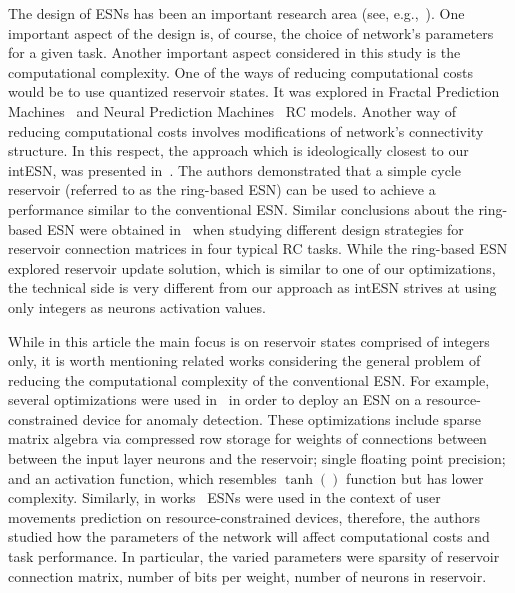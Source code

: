 The design of ESNs has been an important research area (see, e.g.,~\cite{Ozturk2007, Busing2010, Strauss2012}). 
One important aspect of the design is, of course, the choice of network's parameters for a given task.
Another important aspect considered in this study is the computational complexity. 
One of the ways of reducing computational costs would be to use quantized reservoir states. 
It was explored in Fractal Prediction Machines~\cite{Tino00} and Neural Prediction Machines~\cite{Tino04, Tino07} RC models. 
Another way of reducing computational costs involves modifications of network's connectivity structure. 
In this respect, the approach which is ideologically closest to our intESN, was presented in~\cite{MinESN}. 
The authors demonstrated that a simple cycle reservoir (referred to as the ring-based ESN) can be used to achieve a performance similar to the conventional ESN. 
Similar conclusions about the ring-based ESN were obtained in~\cite{Strauss2012} when studying different design strategies for reservoir connection matrices in four typical RC tasks. 
While the ring-based ESN explored reservoir update solution, which is similar to one of our optimizations, the technical side is very different from our approach as intESN strives at using only integers as neurons activation values.





While in this article the main focus is on reservoir states comprised of integers only, it is worth mentioning related works considering the general problem of reducing the computational complexity of the conventional ESN. 
For example, several optimizations were used in~\cite{ESNAnomaly09} in order to deploy an ESN on a resource-constrained device for anomaly detection.
These optimizations include sparse matrix algebra via compressed row storage for weights of connections between between the input layer neurons and the reservoir; single floating point precision; and an activation function, which resembles $\tanh()$ function but has lower complexity. 
Similarly, in works~\cite{Bacciu2013, Bacciu2014} ESNs were used in the context of user movements prediction on resource-constrained devices, therefore, the authors studied how the parameters of the network will affect computational costs and task performance.
In particular, the varied parameters were sparsity of reservoir connection matrix, number of bits per weight, number of neurons in reservoir.



 



